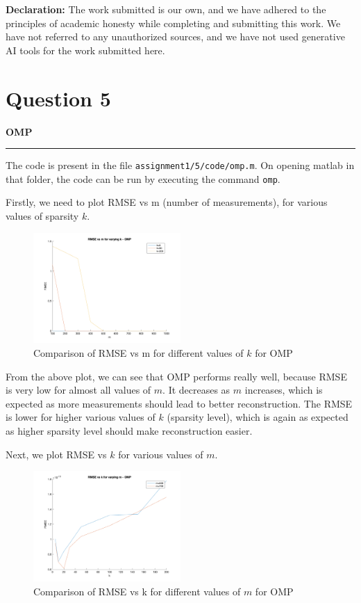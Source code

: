 \documentclass[a4paper,12pt]{article}
\title{\cooltitle{CS754 Assignment-1}}
\author{{\bf Saksham Rathi, Ekansh Ravi Shankar, Kshitij Vaidya}}
\date{}
\newenvironment{solution}[2][]{%
    \begin{mdframed}[linecolor=blue!70!black, linewidth=2pt, roundcorner=10pt, backgroundcolor=yellow!10!white, skipabove=12pt, skipbelow=12pt]%
        \textbf{\large #2}
        \par\noindent\rule{\textwidth}{0.4pt}
}{
    \end{mdframed}
}
\begin{document}
\maketitle

\textbf{Declaration:} The work submitted is our own, and we have adhered to the principles of academic honesty while completing and submitting this work. We have not referred to any unauthorized sources, and we have not used generative AI tools for the work submitted here.

\section*{Question 5}

\begin{solution}{OMP}
The code is present in the file \texttt{assignment1/5/code/omp.m}. On opening matlab in that folder, the code can be run by executing the command \texttt{omp}.

Firstly, we need to plot RMSE vs m (number of measurements), for various values of sparsity $k$. 

\begin{figure}[H]
  \centering
  \includegraphics[width=0.5\textwidth]{../images/omp/omp_k.png}
  \caption{Comparison of RMSE vs m for different values of $k$ for OMP}
  \label{fig:rmse_comparison}
\end{figure}

From the above plot, we can see that OMP performs really well, because RMSE is very low for almost all values of $m$. It decreases as $m$ increases, which is expected as more measurements should lead to better reconstruction. The RMSE is lower for higher various values of $k$ (sparsity level), which is again as expected as higher sparsity level should make reconstruction easier.


Next, we plot RMSE vs $k$ for various values of $m$.

\begin{figure}[H]
  \centering
  \includegraphics[width=0.5\textwidth]{../images/omp/omp_m.png}
  \caption{Comparison of RMSE vs k for different values of $m$ for OMP}
  \label{fig:rmse_comparison2}
\end{figure}



\end{solution}
\end{document}
